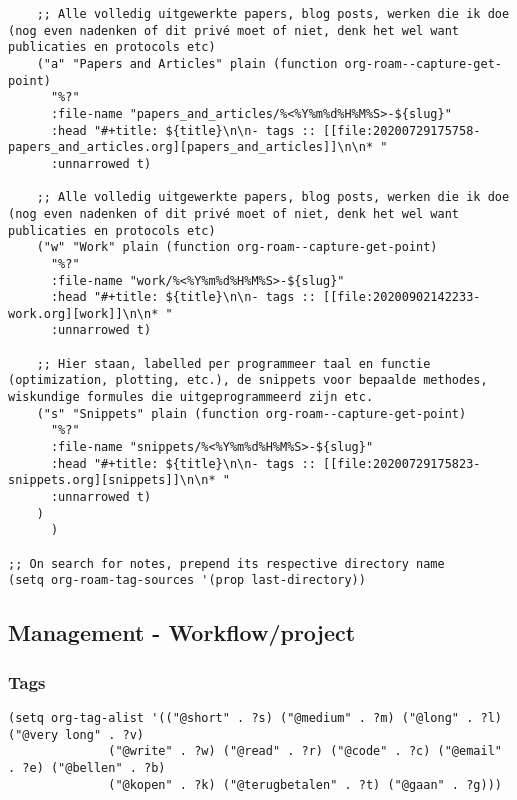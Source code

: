\documentclass[11pt]{article}
\begin{document}
\begin{verbatim}
	;; Alle volledig uitgewerkte papers, blog posts, werken die ik doe (nog even nadenken of dit privé moet of niet, denk het wel want publicaties en protocols etc)
	("a" "Papers and Articles" plain (function org-roam--capture-get-point)
	  "%?"
	  :file-name "papers_and_articles/%<%Y%m%d%H%M%S>-${slug}"
	  :head "#+title: ${title}\n\n- tags :: [[file:20200729175758-papers_and_articles.org][papers_and_articles]]\n\n* "
	  :unnarrowed t)

	;; Alle volledig uitgewerkte papers, blog posts, werken die ik doe (nog even nadenken of dit privé moet of niet, denk het wel want publicaties en protocols etc)
	("w" "Work" plain (function org-roam--capture-get-point)
	  "%?"
	  :file-name "work/%<%Y%m%d%H%M%S>-${slug}"
	  :head "#+title: ${title}\n\n- tags :: [[file:20200902142233-work.org][work]]\n\n* "
	  :unnarrowed t)

	;; Hier staan, labelled per programmeer taal en functie (optimization, plotting, etc.), de snippets voor bepaalde methodes, wiskundige formules die uitgeprogrammeerd zijn etc.
	("s" "Snippets" plain (function org-roam--capture-get-point)
	  "%?"
	  :file-name "snippets/%<%Y%m%d%H%M%S>-${slug}"
	  :head "#+title: ${title}\n\n- tags :: [[file:20200729175823-snippets.org][snippets]]\n\n* "
	  :unnarrowed t)
	)
      )

;; On search for notes, prepend its respective directory name
(setq org-roam-tag-sources '(prop last-directory))
\end{verbatim}
\subsection{Management - Workflow/project}
\label{sec:orgd609e76}
\subsubsection{Tags}
\label{sec:orgdc6b6d8}
\begin{verbatim}
(setq org-tag-alist '(("@short" . ?s) ("@medium" . ?m) ("@long" . ?l) ("@very long" . ?v)
		      ("@write" . ?w) ("@read" . ?r) ("@code" . ?c) ("@email" . ?e) ("@bellen" . ?b)
		      ("@kopen" . ?k) ("@terugbetalen" . ?t) ("@gaan" . ?g)))
\end{verbatim}
\end{document}
